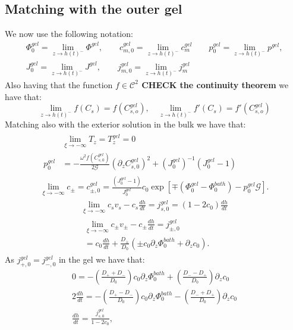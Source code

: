 \documentclass[12pt]{extarticle}
\begin{document}
\subsection{Matching with the outer gel}
We now use the following notation:
\begin{equation}
\begin{aligned}
\Phi^{gel}_0=\lim_{z\rightarrow h(t)^-} \Phi^{gel}, \qquad c^{gel}_{m,0}=\lim_{z\rightarrow h(t)^-} c^{gel}_{m} \qquad p_0^{gel}=\lim_{z\rightarrow h(t)^-} p^{gel},\\
J^{gel}_0=\lim_{z\rightarrow h(t)^-} J^{gel}, \qquad j^{gel}_{m,0}=\lim_{z\rightarrow h(t)^-} j^{gel}_m
\end{aligned}
\end{equation}
Also having that the function \color{red}\textbf{$f\in \mathcal{C}^2$ CHECK the continuity theorem} we have that:\color{black}
\begin{equation}
\lim_{z\rightarrow h(t)^-} f(C_s)= f(C^{gel}_{s,o}), \quad \lim_{z\rightarrow h(t)^-} f'(C_s)= f'(C^{gel}_{s,o})
\end{equation}
Matching also with the exterior solution in the bulk we have that:
\begin{gather}
\begin{aligned}
&\lim_{\xi\rightarrow -\infty} T_z = T^{gel}_z =0 \\
p^{gel}_0& = -\frac{\omega^2 f(C^{gel}_{s,0})}{2\mathcal{G}} (\partial_z C^{gel}_{s,0})^2+ (J^{gel}_0)^{-1}\left(J^{gel}_0-1\right)\label{eq1}
\end{aligned}\\
\lim_{\xi\rightarrow -\infty} c_\pm = c^{gel}_{\pm,0} = \frac{(J^{gel}_0-1)}{J^{gel}_0}c_0\exp[\mp(\Phi^{gel}_0-\Phi_0^{bath})-p_0^{gel}\mathcal{G}].
\end{gather}
\begin{gather}
\lim_{\xi\rightarrow -\infty} c_s v_s - c_s \frac{dh}{dt}= j^{gel}_{s,0} =(1-2c_0)\frac{dh}{dt}\\
\begin{aligned}
\lim_{\xi\rightarrow -\infty}c_\pm v_\pm - c_\pm \frac{dh}{dt}=j^{gel}_{\pm,0}\\
=c_0 \frac{dh}{dt}  +\frac{D_\pm}{D_0}\left(\pm c_0 \partial_z \Phi^{bath}_0+\partial_z c_0\right).
\end{aligned}
\end{gather}
As $j^{gel}_{+,0}=j^{gel}_{-,0}$ in the gel we have that:
\begin{eqnarray}
0= - \left(\frac{D_++D_-}{D_0}\right)c_0\partial_z \Phi^{bath}_0 + \left(\frac{D_--D_+}{D_0}\right)\partial_z c_0\label{A}\\
2 \frac{d h}{dt} =- \left(\frac{D_+-D_-}{D_0}\right)c_0\partial_z \Phi^{bath}_0 - \left(\frac{D_-+D_+}{D_0}\right)\partial_z c_0\label{B}\\
\frac{d h}{dt} = \frac{j_{s,0}^{gel}}{1-2c_0},
\end{eqnarray}
\end{document}

